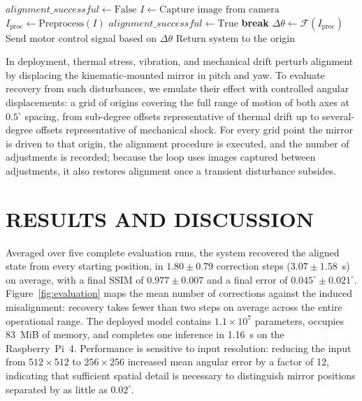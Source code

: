 \documentclass[]{spie}  %
\begin{document}
\begin{algorithm}[ht]
\caption{Automatic Alignment}
\label{alg:alignment}
\begin{algorithmic}[1]
    \STATE $alignment\_successful \gets \text{False}$
        \STATE $I \gets \text{Capture image from camera}$
        \STATE $I_{\text{proc}} \gets \text{Preprocess}(I)$
            \STATE $alignment\_successful \gets \text{True}$
            \STATE \textbf{break}
        \ENDIF
        \STATE $\Delta \theta \gets \mathcal{F}(I_{\text{proc}})$
        \STATE Send motor control signal based on $\Delta \theta$
    \ENDFOR
        \STATE Return system to the origin
    \ENDIF
\end{algorithmic}
\end{algorithm}

In deployment, thermal stress, vibration, and mechanical drift perturb alignment by displacing the kinematic-mounted mirror in pitch and yaw. To evaluate recovery from such disturbances, we emulate their effect with controlled angular displacements: a grid of origins covering the full range of motion of both axes at $0.5^\circ$ spacing, from sub-degree offsets representative of thermal drift up to several-degree offsets representative of mechanical shock. For every grid point the mirror is driven to that origin, the alignment procedure is executed, and the number of adjustments is recorded; because the loop uses images captured between adjustments, it also restores alignment once a transient disturbance subsides.

\section{RESULTS AND DISCUSSION}
\label{sec:results}

Averaged over five complete evaluation runs, the system recovered the aligned state from every starting position, in $1.80 \pm 0.79$ correction steps ($3.07 \pm 1.58$~s) on average, with a final SSIM of $0.977 \pm 0.007$ and a final error of $0.045^\circ \pm 0.021^\circ$. Figure~\ref{fig:evaluation} maps the mean number of corrections against the induced misalignment: recovery takes fewer than two steps on average across the entire operational range. The deployed model contains $1.1\times10^7$ parameters, occupies 83~MiB of memory, and completes one inference in 1.16~s on the Raspberry~Pi~4. Performance is sensitive to input resolution: reducing the input from $512 \times 512$ to $256 \times 256$ increased mean angular error by a factor of 12, indicating that sufficient spatial detail is necessary to distinguish mirror positions separated by as little as $0.02^\circ$.
\end{document}
